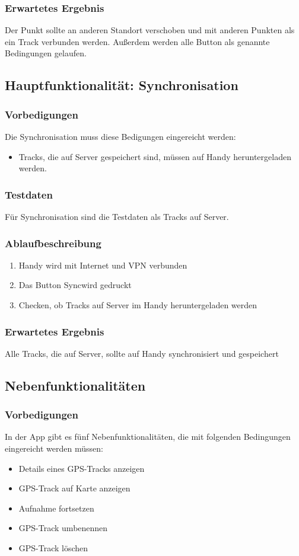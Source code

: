 \documentclass{article}
\begin{document}
\subsubsection{Erwartetes Ergebnis}
	Der Punkt sollte an anderen Standort verschoben und mit anderen Punkten als ein Track verbunden werden. Außerdem werden alle Button als genannte Bedingungen gelaufen.

\subsection{Hauptfunktionalität: Synchronisation}
\subsubsection{Vorbedigungen}
	Die Synchronisation muss diese Bedigungen eingereicht werden:
	\begin{itemize}
		\item Tracks, die auf Server gespeichert sind, müssen auf Handy heruntergeladen werden.
	\end{itemize}
\subsubsection{Testdaten}
	Für Synchronisation sind die Testdaten als Tracks auf Server.
\subsubsection{Ablaufbeschreibung}
	\begin{enumerate}
		\item Handy wird mit Internet und VPN verbunden
		\item Das Button \glqq Sync\grqq wird gedruckt
		\item Checken, ob Tracks auf Server im Handy heruntergeladen werden
	\end{enumerate}
\subsubsection{Erwartetes Ergebnis}
	Alle Tracks, die auf Server, sollte auf Handy synchronisiert und gespeichert

\subsection{Nebenfunktionalitäten}
\subsubsection{Vorbedigungen}
	In der App gibt es fünf Nebenfunktionalitäten, die mit folgenden Bedingungen eingereicht werden müssen:
	\begin{itemize}
		\item Details eines GPS-Tracks anzeigen
		\item GPS-Track auf Karte anzeigen	
		\item Aufnahme fortsetzen
		\item GPS-Track umbenennen
		\item GPS-Track löschen	
	\end{itemize}
\end{document}
